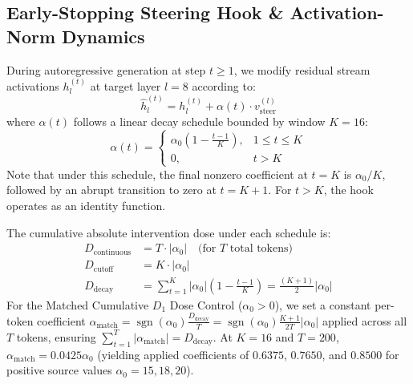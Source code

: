 \documentclass[conference]{IEEEtran}
\begin{document}
\subsection{Early-Stopping Steering Hook \& Activation-Norm Dynamics}
During autoregressive generation at step $t \ge 1$, we modify residual stream activations $h_l^{(t)}$ at target layer $l=8$ according to:
\begin{equation}
\hat{h}_l^{(t)} = h_l^{(t)} + \alpha(t) \cdot v_{\text{steer}}^{(l)}
\end{equation}
where $\alpha(t)$ follows a linear decay schedule bounded by window $K=16$:
\begin{equation}
\alpha(t) = \begin{cases}
\alpha_0 \left(1 - \frac{t-1}{K}\right), & 1 \le t \le K \\
0, & t > K
\end{cases}
\end{equation}
Note that under this schedule, the final nonzero coefficient at $t=K$ is $\alpha_0/K$, followed by an abrupt transition to zero at $t=K+1$. For $t > K$, the hook operates as an identity function.

The cumulative absolute intervention dose under each schedule is:
\begin{align}
D_{\text{continuous}} &= T \cdot |\alpha_0| \quad \text{(for $T$ total tokens)} \\
D_{\text{cutoff}} &= K \cdot |\alpha_0| \\
D_{\text{decay}} &= \sum_{t=1}^{K} |\alpha_0|\left(1 - \frac{t-1}{K}\right) = \frac{(K+1)}{2}|\alpha_0|
\end{align}
For the Matched Cumulative $D_1$ Dose Control ($\alpha_0 > 0$), we set a constant per-token coefficient $\alpha_{\text{match}} = \operatorname{sgn}(\alpha_0)\frac{D_{\text{decay}}}{T} = \operatorname{sgn}(\alpha_0)\frac{K+1}{2T}|\alpha_0|$ applied across all $T$ tokens, ensuring $\sum_{t=1}^T |\alpha_{\text{match}}| = D_{\text{decay}}$. At $K=16$ and $T=200$, $\alpha_{\text{match}} = 0.0425 \alpha_0$ (yielding applied coefficients of $0.6375$, $0.7650$, and $0.8500$ for positive source values $\alpha_0 = 15, 18, 20$).
\end{document}
